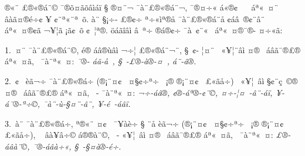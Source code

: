 \documentclass[12pt,twoside,a4paper]{article}
\begin{document}
^^8a^^ae^^ab^^a8 ^^a3^^ae^^ab^^ae^^e1^^ad^^a8^^a9 ^^af^^ae^^f5^^a4^^ad^^e3^^f5^^e2^^ec^^e1^^ef ^^a7 ^^ae^^a4^^ad^^a8^^ac ^^af^^e0^^a8^^a3^^ae^^ab^^ae^^e1^^ad^^a8^^ac,\linebreak 
^^af^^ae^^a4^^f7^^ab ^^e1^^ab^^ae^^a2^^a0 ^^ad^^a0 ^^e1^^aa^^ab^^a0^^a4^^a8 ^^e2^^e0^^e3^^a4^^ad^^ae^^e9^^f7^^a2 ^^ad^^a5 ^^a2^^a8^^aa^^ab^^a8^^aa^^a0^^f5.  ^^8f^^e0^^a8 ^^a7^^a1^^f7-\linebreak
^^a3^^ae^^a2^^f7 ^^aa^^f7^^ab^^ec^^aa^^ae^^e5 ^^af^^e0^^a8^^a3^^ae^^ab^^ae^^e1^^ad^^a8^^e5 ^^a2^^e1^^e2^^a0^^ad^^ae^^a2^^a8^^e2^^a8 ^^e1^^aa^^ab^^a0^^a4^^ae^^a2^^e3 ^^ac^^a5^^a6^^e3\linebreak 
^^a1^^e3^^a2^^a0^^f5 ^^a2^^a0^^a6^^aa^^ae. ^^f6^^e1^^ad^^e3^^ee^^e2^^ec ^^e2^^a0^^aa^^f7 ^^ae^^e1^^ad^^ae^^a2^^ad^^f7 ^^af^^e0^^a0^^a2^^a8^^ab^^a0 ^^e1^^aa^^ab^^a0^^a4^^ae^^af^^ae-\linebreak
^^a4^^f7^^ab^^e3:

1.~^^8e^^a4^^a8^^ad ^^af^^e0^^a8^^a3^^ae^^ab^^ae^^e1^^ad^^a8^^a9, ^^e9^^ae ^^e1^^e2^^ae^^f9^^e2^^ec ^^ac^^f7^^a6 ^^a3^^ae^^ab^^ae^^e1^^ad^^a8^^ac^^a8, ^^a7^^a0^^a2-\linebreak
^^a6^^a4^^a8 ^^ad^^a0^^ab^^a5^^a6^^a8^^e2^^ec ^^a4^^ae ^^ad^^a0^^e1^^e2^^e3^^af^^ad^^ae^^a3^^ae ^^e1^^aa^^ab^^a0^^a4^^e3, ^^ad^^a0^^af^^e0^^a8^^aa^^ab^^a0^^a4: \emph{^^af^^ae-\linebreak
^^e1^^e3-^^e5^^a0, ^^a7^^a0-^^a3^^ae-^^e0^^ae-^^a4^^a0, ^^e1^^a8-^^e2^^ae.}

2.~^^84^^a2^^a0 ^^e8^^e3^^ac^^ad^^f7 ^^af^^e0^^a8^^a3^^ae^^ab^^ae^^e1^^ad^^f7 (^^ae^^a1^^a8^^a4^^a2^^a0 ^^a4^^a7^^a2^^f7^^ad^^aa^^f7 ^^a0^^a1^^ae ^^ae^^a1^^a8^^a4^^a2^^a0\linebreak
^^a3^^ab^^e3^^e5^^f7) ^^ad^^a0^^ab^^a5^^a6^^a0^^e2^^ec ^^a7^^a2^^a8^^e7^^a0^^a9^^ad^^ae ^^a4^^ae ^^ad^^a0^^e1^^e2^^e3^^af^^ad^^ae^^a3^^ae ^^e1^^aa^^ab^^a0^^a4^^e3, ^^ad^^a0-\linebreak
^^af^^e0^^a8^^aa^^ab^^a0^^a4: \emph{^^ac^^f7-^^e1^^e2^^ae, ^^a2^^ae-^^e1^^aa^^ae-^^a2^^a8^^a9, ^^a4^^f7-^^a6^^a4^^a0-^^e2^^a8-^^e1^^ef, ^^ad^^a5-^^e1^^af^^ae-^^aa^^f7^^a9,\linebreak
^^af^^e0^^a8-^^f9-^^a7^^a4^^a8-^^e2^^a8, ^^ad^^a5-^^e9^^a0-^^e1^^e2^^ef.}

3.~^^92^^e0^^a8 ^^af^^e0^^a8^^a3^^ae^^ab^^ae^^e1^^ad^^f7, ^^aa^^ae^^ab^^a8 ^^a4^^a2^^a0 ^^af^^a5^^e0^^e8^^f7 ^^a7 ^^ad^^a8^^e5 ^^e8^^e3^^ac^^ad^^f7\linebreak
(^^ae^^a1^^a8^^a4^^a2^^a0 ^^a4^^a7^^a2^^f7^^ad^^aa^^f7 ^^a0^^a1^^ae ^^ae^^a1^^a8^^a4^^a2^^a0 ^^a3^^ab^^e3^^e5^^f7), ^^a0 ^^e2^^e0^^a5^^e2^^f7^^a9 ^^e1^^ae^^ad^^ae^^e0^^ad^^a8^^a9, ^^ad^^a0-\linebreak
^^ab^^a5^^a6^^a0^^e2^^ec ^^a4^^ae ^^ad^^a0^^e1^^e2^^e3^^af^^ad^^ae^^a3^^ae ^^e1^^aa^^ab^^a0^^a4^^e3, ^^ad^^a0^^af^^e0^^a8^^aa^^ab^^a0^^a4: \emph{^^a3^^ae-^^e1^^e2^^e0^^a8^^a9,\linebreak
^^af^^ae-^^e1^^e2^^e0^^f7^^ab, ^^a7^^a0-^^a7^^a4^^e0^^ae-^^e9^^f7.} 
\end{document}
